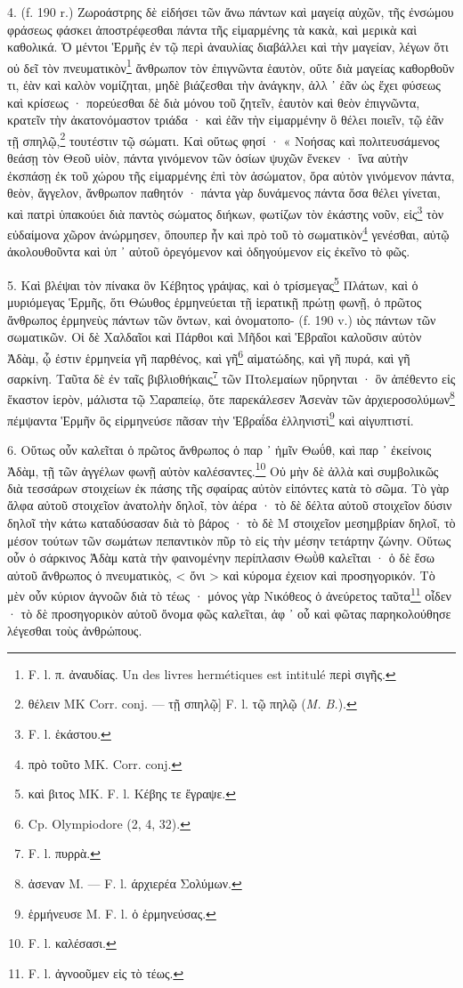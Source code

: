 \documentclass[a4paper, 11pt, oneside, polutonikogreek, french]{article}
\begin{document}
4. (f. 190 r.) Ζωροάστρης δὲ εἰδήσει τῶν ἄνω πάντων καὶ μαγείᾳ αὐχῶν, τῆς ἐνσώμου φράσεως φάσκει ἀποστρέφεσθαι πάντα τῆς εἱμαρμένης τὰ κακὰ, καὶ μερικὰ καὶ καθολικά. Ὁ μέντοι Ἑρμῆς ἐν τῷ περὶ ἀναυλίας διαβάλλει καὶ τὴν μαγείαν, λέγων ὅτι οὐ δεῖ τὸν πνευματικὸν\footnote{F. l. π. ἀναυδίας. Un des livres hermétiques est intitulé περὶ σιγῆς.} ἄνθρωπον τὸν ἐπιγνῶντα ἑαυτὸν, οὔτε διὰ μαγείας καθορθοῦν τι, ἐὰν καὶ καλὸν νομίζηται, μηδὲ βιάζεσθαι τὴν ἀνάγκην, ἀλλ ᾽ ἐᾶν ὡς ἔχει φύσεως καὶ κρίσεως · πορεύεσθαι δὲ διὰ μόνου τοῦ ζητεῖν, ἑαυτὸν καὶ θεὸν ἐπιγνῶντα, κρατεῖν τὴν ἀκατονόμαστον τριάδα · καὶ ἐᾶν τὴν εἱμαρμένην ὃ θέλει ποιεῖν, τῷ ἐᾶν τῇ σπηλῷ,\footnote{θέλειν MK Corr. conj. --- τῇ σπηλῷ] F. l. τῷ πηλῷ (\emph{M. B.}).} τουτέστιν τῷ σώματι. Καὶ οὕτως φησί · « Νοήσας καὶ πολιτευσάμενος θεάσῃ τὸν Θεοῦ υἱὸν, πάντα γινόμενον τῶν ὁσίων ψυχῶν ἕνεκεν · ἵνα αὐτὴν ἐκσπάσῃ ἐκ τοῦ χώρου τῆς εἱμαρμένης ἐπὶ τὸν ἀσώματον, ὅρα αὐτὸν γινόμενον πάντα, θεὸν, ἄγγελον, ἄνθρωπον παθητόν · πάντα γὰρ δυνάμενος πάντα ὅσα θέλει γίνεται, καὶ πατρὶ ὑπακούει διὰ παντὸς σώματος διήκων, φωτίζων τὸν ἑκάστης νοῦν, εἰς\footnote{F. l. ἑκάστου.} τὸν εὐδαίμονα χῶρον ἀνώρμησεν, ὅπουπερ ἦν καὶ πρὸ τοῦ τὸ σωματικὸν\footnote{πρὸ τοῦτο MK. Corr. conj.} γενέσθαι, αὐτῷ ἀκολουθοῦντα καὶ ὑπ ᾽ αὐτοῦ ὀρεγόμενον καὶ ὁδηγούμενον εἰς ἐκεῖνο τὸ φῶς.

5. Καὶ βλέψαι τὸν πίνακα ὃν Κέβητος γράψας, καὶ ὁ τρίσμεγας\footnote{καὶ βιτος MK. F. l. Kέβης τε ἔγραψε.} Πλάτων, καὶ ὁ μυριόμεγας Ἑρμῆς, ὅτι Θώυθος ἑρμηνεύεται τῇ ἱερατικῇ πρώτῃ φωνῇ, ὁ πρῶτος ἄνθρωπος ἑρμηνεὺς πάντων τῶν ὄντων, καὶ ὀνοματοπο- (f. 190 v.) ιὸς πάντων τῶν σωματικῶν. Οἱ δὲ Χαλδαῖοι καὶ Πάρθοι καὶ Μῆδοι καὶ Ἑβραῖοι καλοῦσιν αὐτὸν Ἀδὰμ, ᾧ ἐστιν ἑρμηνεία γῆ παρθένος, καὶ γῆ\footnote{Cp. Olympiodore (2, 4, 32).} αἱματώδης, καὶ γῆ πυρά, καὶ γῆ σαρκίνη. Ταῦτα δὲ ἐν ταῖς βιβλιοθήκαις\footnote{F. l. πυρρὰ.} τῶν Πτολεμαίων ηὕρηνται · ὃν ἀπέθεντο εἰς ἕκαστον ἱερὸν, μάλιστα τῷ Σαραπείῳ, ὅτε παρεκάλεσεν Ἀσενὰν τῶν ἀρχιεροσολύμων\footnote{ἀσεναν M. --- F. l. άρχιερέα Σολύμων.} πέμψαντα Ἑρμῆν ὃς εἱρμηνεύσε πᾶσαν τὴν Ἑβραΐδα ἑλληνιστὶ\footnote{ἑρμήνευσε M. F. l. ὁ ἑρμηνεύσας.} καὶ αἰγυπτιστί.

6. Οὕτως οὖν καλεῖται ὁ πρῶτος ἄνθρωπος ὁ παρ ᾽ ἡμῖν Θωΰθ, καὶ παρ ᾽ ἐκείνοις Ἀδὰμ, τῇ τῶν ἀγγέλων φωνῇ αὐτὸν καλέσαντες.\footnote{F. l. καλέσασι.} Οὐ μὴν δὲ ἀλλὰ καὶ συμβολικῶς διὰ τεσσάρων στοιχείων ἐκ πάσης τῆς σφαίρας αὐτὸν εἰπόντες κατὰ τὸ σῶμα. Τὸ γὰρ ἄλφα αὐτοῦ στοιχεῖον ἀνατολὴν δηλοῖ, τὸν ἀέρα · τὸ δὲ δέλτα αὐτοῦ στοιχεῖον δύσιν δηλοῖ τὴν κάτω καταδύσασαν διὰ τὸ βάρος · τὸ δὲ Μ στοιχεῖον μεσημβρίαν δηλοῖ, τὸ μέσον τούτων τῶν σωμάτων πεπαντικὸν πῦρ τὸ εἰς τὴν μέσην τετάρτην ζώνην. Οὕτως οὖν ὁ σάρκινος Ἀδὰμ κατὰ τὴν φαινομένην περίπλασιν Θωῢθ καλεῖται · ὁ δὲ ἔσω αὐτοῦ ἄνθρωπος ὁ πνευματικὸς, < ὄνι > καὶ κύρομα ἐχειον καὶ προσηγορικόν. Τὸ μὲν οὖν κύριον ἀγνοῶν διὰ τὸ τέως · μόνος γὰρ Νικόθεος ὁ ἀνεύρετος ταῦτα\footnote{F. l. ἀγνοοῦμεν εἰς τὸ τέως.} οἶδεν · τὸ δὲ προσηγορικὸν αὐτοῦ ὄνομα φῶς καλεῖται, ἀφ ᾽ οὗ καὶ φῶτας παρηκολούθησε λέγεσθαι τοὺς ἀνθρώπους.
\end{document}
